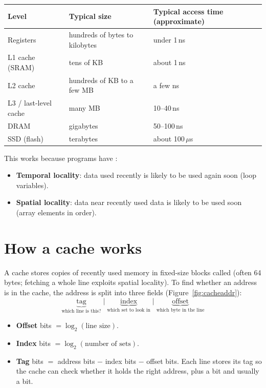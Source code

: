 \begin{center}
\begin{tabular}{lll}
\toprule
Level & Typical size & Typical access time (approximate) \\
\midrule
Registers & hundreds of bytes to kilobytes & under 1\,ns \\
L1 cache (SRAM) & tens of KB & about 1\,ns \\
L2 cache & hundreds of KB to a few MB & a few ns \\
L3 / last-level cache & many MB & 10--40\,ns \\
DRAM & gigabytes & 50--100\,ns \\
SSD (flash) & terabytes & about 100\,$\mu$s \\
\bottomrule
\end{tabular}
\end{center}

This works because programs have :
\begin{itemize}
  \item \textbf{Temporal locality}: data used recently is likely to be used again soon (loop variables).
  \item \textbf{Spatial locality}: data near recently used data is likely to be used soon (array elements in order).
\end{itemize}

\section{How a cache works}

A cache stores copies of recently used memory in fixed-size blocks called  (often 64 bytes; fetching a whole line exploits spatial locality). To find whether an address is in the cache, the address is split into three fields (Figure~\ref{fig:cacheaddr}):
\[
  \underbrace{\text{tag}}_{\text{which line is this?}} \;\big|\; \underbrace{\text{index}}_{\text{which set to look in}} \;\big|\; \underbrace{\text{offset}}_{\text{which byte in the line}}
\]
\begin{itemize}
  \item \textbf{Offset} bits $= \log_2(\text{line size})$.
  \item \textbf{Index} bits $= \log_2(\text{number of sets})$.
  \item \textbf{Tag} bits $=$ address bits $-$ index bits $-$ offset bits. Each line stores its tag so the cache can check whether it holds the right address, plus a  bit and usually a  bit.
\end{itemize}

